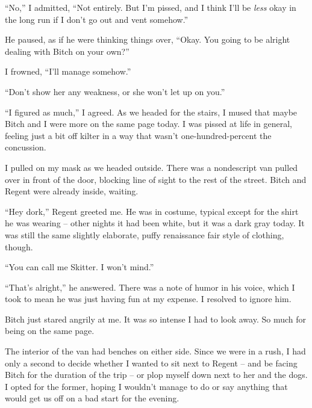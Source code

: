 ``No,'' I admitted, ``Not entirely.  But I'm pissed, and I think I'll be \emph{less} okay in the long run if I don't go out and vent somehow.''



He paused, as if he were thinking things over, ``Okay.  You going to be alright dealing with Bitch on your own?''



I frowned, ``I'll manage somehow.''



``Don't show her any weakness, or she won't let up on you.''



``I figured as much,'' I agreed.  As we headed for the stairs, I mused that maybe Bitch and I were more on the same page today.  I was pissed at life in general, feeling just a bit off kilter in a way that wasn't one-hundred-percent the concussion.



I pulled on my mask as we headed outside.  There was a nondescript van pulled over in front of the door, blocking line of sight to the rest of the street.  Bitch and Regent were already inside, waiting.



``Hey dork,'' Regent greeted me.  He was in costume, typical except for the shirt he was wearing – other nights it had been white, but it was a dark gray today.  It was still the same slightly elaborate, puffy renaissance fair style of clothing, though.



``You can call me Skitter.  I won't mind.''



``That's alright,'' he answered.  There was a note of humor in his voice, which I took to mean he was just having fun at my expense.  I resolved to ignore him.



Bitch just stared angrily at me.  It was so intense I had to look away.  So much for being on the same page.



The interior of the van had benches on either side.  Since we were in a rush, I had only a second to decide whether I wanted to sit next to Regent – and be facing Bitch for the duration of the trip – or plop myself down next to her and the dogs.  I opted for the former, hoping I wouldn't manage to do or say anything that would get us off on a bad start for the evening.



